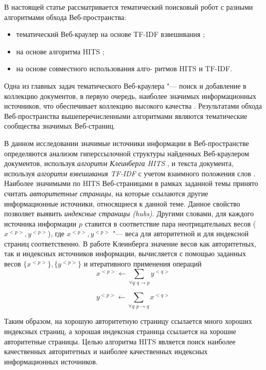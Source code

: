 В настоящей статье рассматривается тематический поисковый робот с разными алгоритмами обхода Веб-пространства:
\begin{itemize}
	\item тематический Веб-краулер на основе TF-IDF взвешивания \cite{Nekrestyanov};
	\item на основе алгоритма HITS \cite{BlekanovBondarenko2};
	\item на основе совместного использования алго- ритмов HITS и TF-IDF.
\end{itemize}

Одна из главных задач тематического Веб-краулера "--- поиск и добавление в коллекцию документов, в первую очередь, наиболее значимых информационных источников, что обеспечивает коллекцию высокого качества \cite{ArasuChoGM}. Результатами обхода Веб-пространства вышеперечисленными алгоритмами являются тематические сообщества \cite{GibsonKleinbergRaghavan} значимых Веб-страниц.

В данном исследовании значимые источники информации в Веб-пространстве определяются анализом гиперссылочной структуры найденных Веб-краулером документов, используя \textit{алгоритм Клеинберга HITS} \cite{Kleinberg}, и текста документа, используя \textit{алгоритм взвешивания TF-IDF} \cite{SinghalKaszkiel} с учетом взаимного положения слов \cite{Gubin}. Наиболее значимыми по HITS Веб-страницами в рамках заданной темы принято считать \textit{авторитетные страницы}, на которые ссылаются другие информационные источники, относящиеся к данной теме. Данное свойство позволяет выявить \textit{индексные страницы (hubs)}. Другими словами, для каждого источника информации \(p\) ставится в соответствие пара неотрицательных весов (\(x^{<p>}, y^{<p>}\)), где \(x^{<p>}, y^{<p>}\) "--- веса для авторитетной и для индексной страниц соответственно. В работе Клеинберга \cite{Kleinberg} значение весов как авторитетных, так и индексных источников информации, вычисляется с помощью заданных весов \(\{x^{<p>}\}, \{y^{<p>}\}\) и итеративного применения операций
\begin{equation}
	\label{eqn:1}
	x^{<p>} \leftarrow \sum_{\forall q: q \rightarrow p} y^{<q>}
\end{equation}

\begin{equation}
	\label{eqn:2}
	y^{<p>} \leftarrow \sum_{\forall q: p \rightarrow q} x^{<q>}
\end{equation}

Таким образом, на хорошую авторитетную страницу ссылается много хороших индексных страниц, а хорошая индексная страница ссылается на хорошие авторитетные страницы. Целью алгоритма HITS является поиск наиболее качественных авторитетных и наиболее качественных индексных информационных источников.

